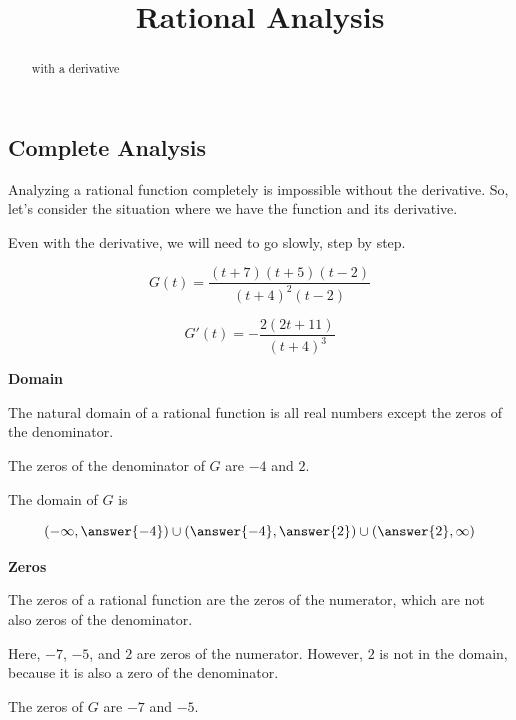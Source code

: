 \documentclass{ximera}
\title{Rational Analysis}
\begin{document}
\begin{abstract}
with a derivative
\end{abstract}
\maketitle





\subsection*{Complete Analysis}


Analyzing a rational function completely is impossible without the derivative. So, let's consider the situation where we have the function and its derivative. 

Even with the derivative, we will need to go slowly, step by step.



\[
G(t) = \frac{(t+7)(t+5)(t-2)}{(t+4)^2(t-2)}
\]

\[
G'(t) = -\frac{2(2t+11)}{(t+4)^3}
\]



\textbf{\textcolor{purple!85!blue}{Domain}} 

\begin{explanation}

The natural domain of a rational function is all real numbers except the zeros of the denominator. 

The zeros of the denominator of $G$ are $-4$ and $2$. 


The domain of $G$ is 

\[
\left( -\infty, \answer{-4} \right) \cup \left(\answer{-4}, \answer{2} \right) \cup \left( \answer{2}, \infty \right)
\]


\end{explanation}









\textbf{\textcolor{purple!85!blue}{Zeros}} 
\begin{explanation}

The zeros of a rational function are the zeros of the numerator, which are not also zeros of the denominator.


Here, $-7$, $-5$, and $2$ are zeros of the numerator.  However, $2$ is not in the domain, because it is also a zero of the denominator.


The zeros of $G$ are $-7$ and $-5$.


\end{explanation}
\end{document}
